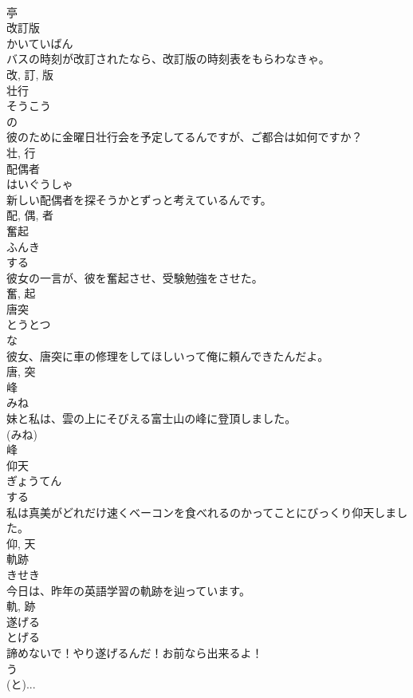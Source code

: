 \documentclass[8pt]{extreport}
\begin{document}
\begin{CJK}{UTF8}{min}
\\	亭	
\\	改訂版	
\\	かいていばん	
\\	バスの時刻が改訂されたなら、改訂版の時刻表をもらわなきゃ。	
\\	改, 訂, 版	
\\	壮行	
\\	そうこう	
\\	の 
\\	彼のために金曜日壮行会を予定してるんですが、ご都合は如何ですか？	
\\	壮, 行	
\\	配偶者	
\\	はいぐうしゃ	
\\	新しい配偶者を探そうかとずっと考えているんです。	
\\	配, 偶, 者	
\\	奮起	
\\	ふんき	
\\	する 
\\	彼女の一言が、彼を奮起させ、受験勉強をさせた。	
\\	奮, 起	
\\	唐突	
\\	とうとつ	
\\	な 
\\	彼女、唐突に車の修理をしてほしいって俺に頼んできたんだよ。	
\\	唐, 突	
\\	峰	
\\	みね	
\\	妹と私は、雲の上にそびえる富士山の峰に登頂しました。	
\\	(みね) 
\\	峰	
\\	仰天	
\\	ぎょうてん	
\\	する 
\\	私は真美がどれだけ速くベーコンを食べれるのかってことにびっくり仰天しました。	
\\	仰, 天	
\\	軌跡	
\\	きせき	
\\	今日は、昨年の英語学習の軌跡を辿っています。	
\\	軌, 跡	
\\	遂げる	
\\	とげる	
\\	諦めないで！やり遂げるんだ！お前なら出来るよ！	
\\	う 
\\	(と)... 

\end{CJK}
\end{document}
